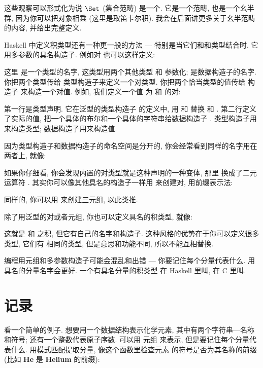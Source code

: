 
这些观察可以形式化为说 $\Set$ (集合范畴) 是一个. 它是一个范畴,
也是一个幺半群, 因为你可以把对象相乘 (这里是取笛卡尔积). 我会在后面讲更多关于幺半范畴的内容, 并给出完整定义.

Haskell 中定义积类型还有一种更一般的方法 --- 特别是当它们和和类型结合时. 它用多参数的具名构造子. 例如对
也可以这样定义:

这里  是一个类型的名字, 这类型用两个其他类型  和  参数化; 
是数据构造子的名字. 你把两个类型传给  类型构造子来定义一个对类型. 你把两个恰当类型的值传给
构造子  来构造一个对值. 例如, 我们定义一个值  为  和  的对:

第一行是类型声明. 它在泛型的类型构造子  的定义中, 用  和  替换  和
. 第二行定义了实际的值, 把一个具体的布尔和一个具体的字符串给数据构造子 . 类型构造子用来构造类型;
数据构造子用来构造值.

因为类型构造子和数据构造子的命名空间是分开的, 你会经常看到同样的名字用在两者上, 就像:

如果你仔细看, 你会发现内置的对类型就是这种声明的一种变体, 那里  换成了二元运算符 \code{(,)}.
其实你可以像其他具名的构造子一样用 \code{(,)} 来创建对, 用前缀表示法:

同样的, 你可以用 \code{(,,)} 来创建三元组, 以此类推.

除了用泛型的对或者元组, 你也可以定义具名的积类型, 就像:

这就是  和  之积, 但它有自己的名字和构造子. 这种风格的优势在于你可以定义很多类型, 它们有
相同的类型, 但是意思和功能不同, 所以不能互相替换.

编程用元组和多参数构造子可能会混乱和出错 --- 你要记住每个分量代表什么. 用具名的分量名字会更好. 一个有具名分量的积类型
在 Haskell 里叫, 在 C 里叫.

\section{记录}

看一个简单的例子. 想要用一个数据结构表示化学元素, 其中有两个字符串---名称和符号; 还有一个整数代表原子序数. 可以用
元组  来表示, 但是要记住每个分量代表什么. 用模式匹配提取分量, 像这个函数里检查元素
的符号是否为其名称的前缀(比如 \textbf{He} 是 \textbf{Helium} 的前缀):

